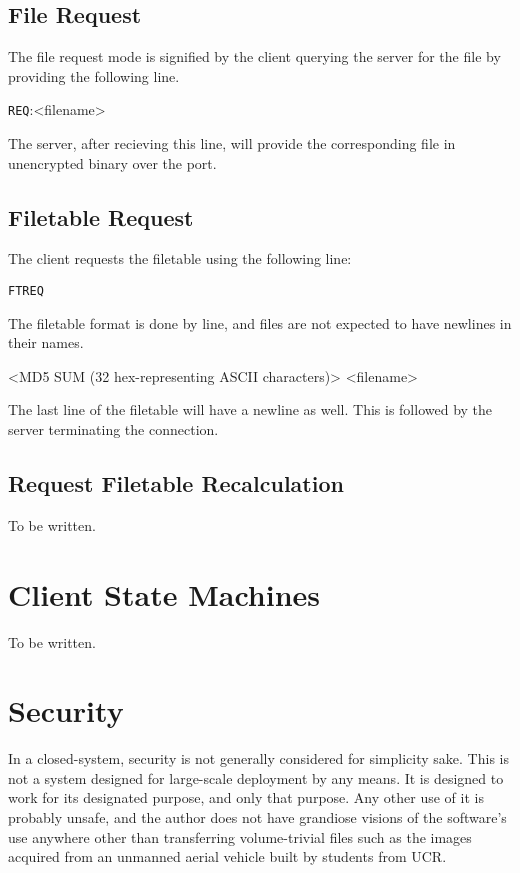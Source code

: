 \documentclass[12pt]{article}
\begin{document}
\subsection{File Request}
\label{ssec:Request File}
The file request mode is signified by the client querying the server for the
file by providing the following line.

\noindent
\verb+REQ+:\textvisiblespace <filename>\carriagereturn\carriagereturn

The server, after recieving this line, will provide the corresponding file in
unencrypted binary over the port.

\subsection{Filetable Request}
\label{ssec:Request Filetable}
The client requests the filetable using the following line:

\noindent
\verb+FTREQ+\carriagereturn\carriagereturn

The filetable format is done by line, and files are not expected to have
newlines in their names.

\noindent
<MD5 SUM (32 hex-representing ASCII characters)>\textvisiblespace
\textvisiblespace<filename>\carriagereturn

The last line of the filetable will have a newline as well.  This is followed
by the server terminating the connection.

\subsection{Request Filetable Recalculation}
\label{ssec:Recalculate MD5}
To be written.

\section{Client State Machines}
To be written.

\section{Security}
\label{sec:Security}
In a closed-system, security is not generally considered for simplicity sake.
This is not a system designed for large-scale deployment by any means.
It is designed to work for its designated purpose, and only that purpose.
Any other use of it is probably unsafe, and the author does not have grandiose
visions of the software's use anywhere other than transferring volume-trivial
files such as the images acquired from an unmanned aerial vehicle built by
students from UCR.
\end{document}
